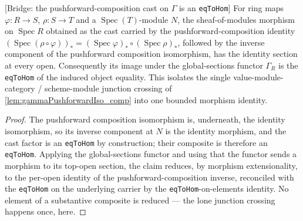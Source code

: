 \begin{lemma}

[Bridge: the pushforward-composition cast on \(\Gamma\) is an \texttt{eqToHom}]
  \label{lem:gammaPushforwardIso_comp_bridge}
  For ring maps \(\varphi : R \to S\), \(\rho : S \to T\) and a
  \(\operatorname{Spec}(T)\)-module \(N\), the sheaf-of-modules morphism on
  \(\operatorname{Spec} R\) obtained as the cast carried by the pushforward-composition
  identity \((\operatorname{Spec}(\rho\circ\varphi))_* = (\operatorname{Spec}\varphi)_*\circ
  (\operatorname{Spec}\rho)_*\), followed by the inverse component of the pushforward
  composition isomorphism, has the identity section at every open. Consequently its image
  under the global-sections functor \(\Gamma_R\) is the \texttt{eqToHom} of the induced
  object equality. This isolates the single value-module-category / scheme-module junction
  crossing of \cref{lem:gammaPushforwardIso_comp} into one bounded morphism identity.
\end{lemma}

\begin{proof}
  The pushforward composition isomorphism is, underneath, the identity isomorphism, so its
  inverse component at \(N\) is the identity morphism, and the cast factor is an
  \texttt{eqToHom} by construction; their composite is therefore an \texttt{eqToHom}.
  Applying the global-sections functor and using that the functor sends a morphism to its
  top-open section, the claim reduces, by morphism extensionality, to the per-open identity
  of the pushforward-composition inverse, reconciled with the \texttt{eqToHom} on the
  underlying carrier by the \texttt{eqToHom}-on-elements identity. No element of a
  substantive composite is reduced — the lone junction crossing happens once, here.
\end{proof}

